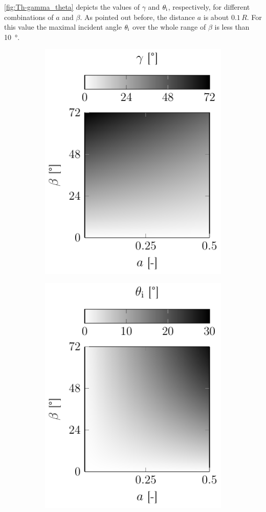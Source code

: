 \cref{fig:Th-gamma_theta} depicts the values of $\gamma$ and $\theta_{\mathrm{i}}$, 
respectively, for different combinations of $a$ and $\beta$. As pointed out 
before, the distance $a$ is about $0.1\,R$. For this value the maximal incident 
angle $\theta_{\mathrm{i}}$ over the whole range of $\beta$ is less than 
\SI{10}{\degree}.

\begin{figure}
  \centering
  \begin{subfigure}[b]{0.45\textwidth}
    \centering
    \caption{}
    \includegraphics[]{Plots/cache/gamma.pdf}
    \label{fig:Th-gamma}
  \end{subfigure}
  \hfill
  \begin{subfigure}[b]{0.45\textwidth}
    \centering
    \caption{}
    \includegraphics[]{Plots/cache/theta_i.pdf}

\end{subfigure}
\end{figure}
